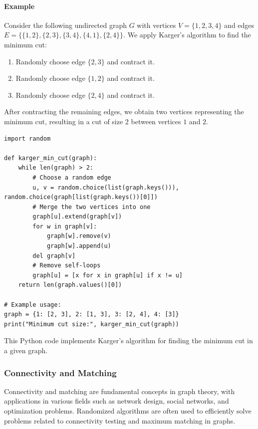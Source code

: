 \documentclass[12pt]{book} %
\begin{document}
\paragraph{Example}
Consider the following undirected graph \(G\) with vertices \(V = \{1, 2, 3, 4\}\) and edges \(E = \{\{1, 2\}, \{2, 3\}, \{3, 4\}, \{4, 1\}, \{2, 4\}\}\). We apply Karger's algorithm to find the minimum cut:

\begin{enumerate}
    \item Randomly choose edge \(\{2, 3\}\) and contract it.
    \item Randomly choose edge \(\{1, 2\}\) and contract it.
    \item Randomly choose edge \(\{2, 4\}\) and contract it.
\end{enumerate}

After contracting the remaining edges, we obtain two vertices representing the minimum cut, resulting in a cut of size 2 between vertices \(1\) and \(2\).

\FloatBarrier
\begin{lstlisting}
import random

def karger_min_cut(graph):
    while len(graph) > 2:
        # Choose a random edge
        u, v = random.choice(list(graph.keys())), random.choice(graph[list(graph.keys())[0]])
        # Merge the two vertices into one
        graph[u].extend(graph[v])
        for w in graph[v]:
            graph[w].remove(v)
            graph[w].append(u)
        del graph[v]
        # Remove self-loops
        graph[u] = [x for x in graph[u] if x != u]
    return len(graph.values()[0])

# Example usage:
graph = {1: [2, 3], 2: [1, 3], 3: [2, 4], 4: [3]}
print("Minimum cut size:", karger_min_cut(graph))
\end{lstlisting}
\FloatBarrier

This Python code implements Karger's algorithm for finding the minimum cut in a given graph.


\subsubsection{Connectivity and Matching}
Connectivity and matching are fundamental concepts in graph theory, with applications in various fields such as network design, social networks, and optimization problems. Randomized algorithms are often used to efficiently solve problems related to connectivity testing and maximum matching in graphs.
\end{document}
